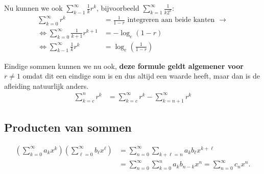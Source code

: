 Nu kunnen we ook $\displaystyle \sum_{k-1}^\infty \frac{1}{k} r^k$, bijvoorbeeld $\displaystyle \sum_{k=1}^{\infty} \frac{1}{k2^k}$:
\begin{align*}
    \sum_{k=0}^{\infty} r^k &= \frac{1}{1-r} \text { integreren aan beide kanten } \to \\
    \iff \sum_{k=0}^{\infty} \frac{1}{k+1} r^{k+1} &= -\log_e (1-r) \\
    \iff \sum_{k-1}^\infty \frac{1}{k} r^k &= \log_e (\frac{1}{1-r})
\end{align*}

Eindige sommen kunnen we nu ook, \textbf{deze formule geldt algemener voor $r\neq 1$} omdat dit een eindige som is en dus altijd een waarde heeft, maar dan is de afleiding natuurlijk anders.
\begin{align*}
    \sum_{k=c}^n r^k &= \sum_{k=c}^\infty r^k - \sum_{k=n+1}^\infty r^k
\end{align*}

\subsection{Producten van sommen}\label{subsec:producten}

\begin{align*}
    \left( \sum_{k=0}^\infty a_k x^k \right) \left( \sum_{\ell=0}^\infty b_\ell x^\ell \right) &= \sum_{n=0}^\infty \sum_{k+\ell =n} a_k b_\ell x^{k+\ell} \\
    &= \sum_{n=0}^\infty \sum_{k=0}^n a_k b_{n-k} x^n = \sum_{n=0}^\infty c_n x^n.
\end{align*}